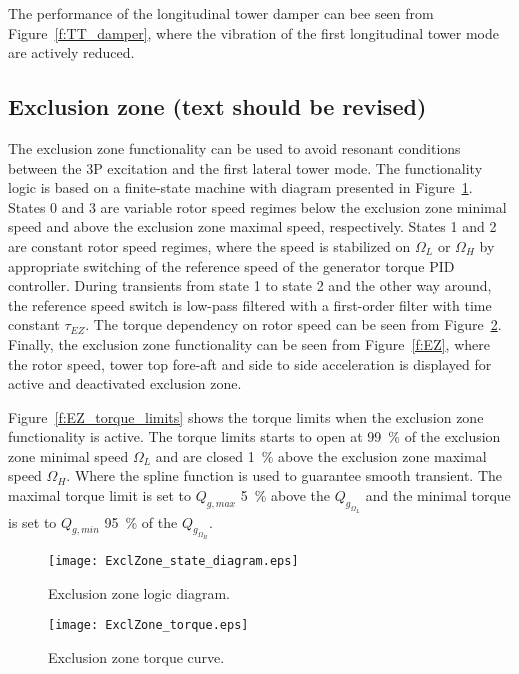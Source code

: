 The performance of the longitudinal tower damper can bee seen from Figure~\ref{f:TT_damper}, where the vibration of the first longitudinal tower mode are actively reduced.

\subsection{Exclusion zone (text should be revised)}
\label{s:EZ}

The exclusion zone functionality can be used to avoid resonant conditions between the 3P excitation and the first lateral tower mode. The functionality logic is based on a finite-state machine with diagram presented in Figure~\ref{f:EZ_SD}. States 0 and 3 are variable rotor speed regimes below the exclusion zone minimal speed and above the exclusion zone maximal speed, respectively. States 1 and 2 are constant rotor speed regimes, where the speed is stabilized on $\Omega_L$ or $\Omega_H$ by appropriate switching of the reference speed of the generator torque PID controller. During transients from state 1 to state 2 and the other way around, the reference speed switch is low-pass filtered with a first-order filter with time constant $\tau_{EZ}$. The torque dependency on rotor speed can be seen from Figure~\ref{f:EZ_torque}. Finally, the exclusion zone functionality can be seen from Figure~\ref{f:EZ}, where the rotor speed, tower top fore-aft and side to side acceleration is displayed for active and deactivated exclusion zone.

Figure~\ref{f:EZ_torque_limits} shows the torque limits when the exclusion zone functionality is active. The torque limits starts to open at 99~\% of the exclusion zone minimal speed $\Omega_{L}$ and are closed  1~\% above the exclusion zone maximal speed $\Omega_{H}$. Where the spline function is used to guarantee smooth transient. The maximal torque limit is set to $Q_{g,max}$ 5~\% above the $Q_{g_{\Omega_{L}}}$ and the minimal torque is set to $Q_{g,min}$ 95~\% of the $Q_{g_{\Omega_{H}}}$.

\begin{figure}[b!]
\centerline{
\texttt{[image: ExclZone\_state\_diagram.eps]} }
\caption{Exclusion zone logic diagram. \label{f:EZ_SD}}
\end{figure}

\begin{figure}[tb]
\centerline{
\texttt{[image: ExclZone\_torque.eps]} }
\caption{Exclusion zone torque curve. \label{f:EZ_torque}}
\end{figure}

